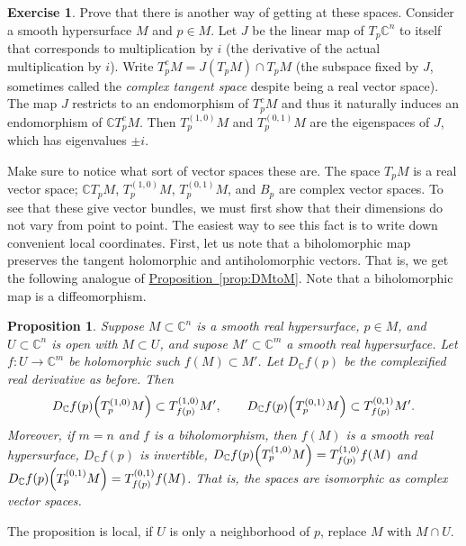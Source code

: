 \documentclass[12pt,openany]{book}
\newcommand{\avoidbreak}{\postdisplaypenalty=100}
\newcommand{\C}{{\mathbb{C}}}
\newcommand{\myindex}[1]{#1\index{#1}}
\theoremstyle{plain}
\newtheorem{prop}[thm]{Proposition}
\theoremstyle{remark}
\theoremstyle{definition}
\newenvironment{exbox}{%
    \def\FrameCommand{\vrule width 1pt \relax\hspace{10pt}}%
    \MakeFramed{\advance\hsize-\width\FrameRestore}%
}{%
    \endMakeFramed
}
\theoremstyle{exercise}
\newtheorem{exercise}{Exercise}[section]
\theoremstyle{example}
\newcommand{\propref}[1]{\hyperref[#1]{Proposition~\ref*{#1}}}
\begin{document}
\begin{exbox}
\begin{exercise}
Prove that there is another way of getting at these spaces.  Consider a smooth
hypersurface $M$ and $p \in M$.  Let $J$ be the linear map of $T_p \C^n$ to
itself that corresponds to multiplication by $i$
(the derivative of the actual multiplication by $i$).
Write $T^c_p M = J(T_p M) \cap T_pM$ (the subspace fixed by $J$, sometimes
called the \emph{\myindex{complex tangent space}} despite being a real
vector space).
The map $J$ restricts to an endomorphism of $T^c_pM$ and thus it naturally induces
an endomorphism of $\C T^c_pM$.
Then $T^{(1,0)}_pM$ and
$T^{(0,1)}_pM$ are the eigenspaces of $J$, which has eigenvalues $\pm i$.
\end{exercise}
\end{exbox}

Make sure to notice what sort of vector spaces these are.
The space $T_pM$ is a real vector space;
$\C T_pM$, $T_p^{(1,0)}M$, $T_p^{(0,1)} M$, and $B_p$
are complex vector spaces.
To see that these give vector bundles,
we must first show that their dimensions do not vary
from point to point.  The easiest way to see this fact is to write down
convenient local coordinates.  First, let us note that
a biholomorphic map preserves the tangent holomorphic and antiholomorphic
vectors.  That is, we get the following
analogue of \propref{prop:DMtoM}.
Note that a biholomorphic map is a diffeomorphism.

\begin{prop} \label{prop:whereTgoeshol}
Suppose $M \subset \C^n$ is a smooth real hypersurface, $p \in M$,
and $U \subset \C^n$ is open with $M \subset U$, and supose $M' \subset
\C^m$ a smooth real hypersurface.
Let $f \colon U \to \C^m$ be holomorphic such $f(M) \subset M'$.
Let $D_\C f(p)$ be
the complexified real derivative as before.  Then
\begin{equation*}
D_\C f(p)\Bigl(T_p^{(1,0)}M\Bigr) \subset T_{f(p)}^{(1,0)}M', \qquad
D_\C f(p)\Bigl(T_p^{(0,1)}M\Bigr) \subset T_{f(p)}^{(0,1)}M'.
\avoidbreak
\end{equation*}
Moreover, if $m=n$ and $f$ is a biholomorphism,
then $f(M)$ is a smooth real hypersurface,
$D_\C f(p)$ is invertible,
$D_\C f(p)\Bigl(T_p^{(1,0)}M\Bigr) = T_{f(p)}^{(1,0)} f(M)$
and
$D_\C f(p)\Bigl(T_p^{(0,1)}M\Bigr) = T_{f(p)}^{(0,1)} f(M)$.
That is, the spaces are isomorphic as complex vector spaces.
\end{prop}

The proposition is local, if $U$ is only a neighborhood of $p$,
replace $M$ with $M \cap U$.
\end{document}
